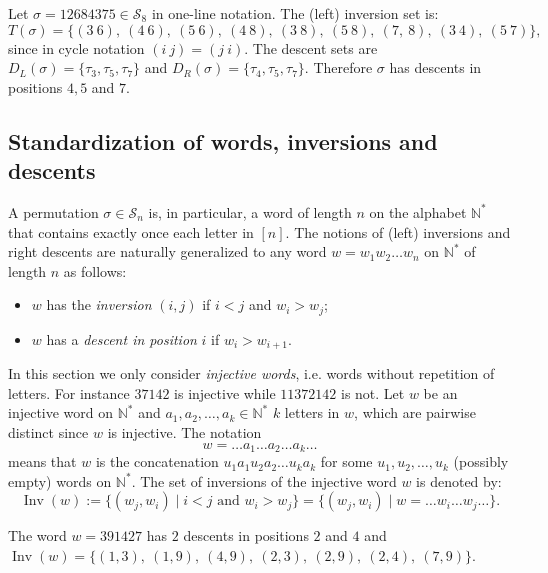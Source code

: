 \documentclass[ALCO,Unicode]{cedram}
\theoremstyle{definition}
\newcommand{\Sym}[1]{\mathcal{S}_{#1}}
\newcommand{\Symn}{\Sym{n}}
\newcommand{\NN}{\mathbb{N}}
\DeclareMathOperator{\invs}{Inv}
\begin{document}
\begin{ex}\label{ex:Sn1} Let $\sigma = 12684375\in\mathcal S_8$ in one-line notation. The (left) inversion set is:
$$
T(\sigma)=\{(3\ 6),\ (4\ 6),\ (5\ 6),\ (4\ 8),\ (3\ 8),\ (5\ 8),\  (7,\ 8),\ (3\ 4),\ (5\ 7)\},
$$ 
since in cycle notation $(i\ j)=(j\ i)$. 
The descent sets are $D_L(\sigma)=\{\tau_3,\tau_5,\tau_7\}$ and $D_R(\sigma)=\{\tau_4, \tau_5,\tau_7\}$. Therefore $\sigma$ has descents in positions $4,5$ and $7$.
\end{ex}

\subsection{Standardization of words, inversions and descents}\label{ss:TypeA-inversions}  A permutation $\sigma\in \Symn$ is, in particular, a word of length $n$ on the alphabet $\NN^*$ that contains exactly once each letter in $[n]$.  The notions of (left) inversions and right descents are naturally generalized to any word $w=w_1w_2\dots w_n$ on $\NN^*$ of length $n$ as follows:
\begin{itemize}
\item  $w$ has the {\em inversion} $(i,j)$ if $i < j$ and $w_i > w_j$;
\item $w$ has a  \emph{descent in position} $i$ if $w_i > w_{i+1}$. 
\end{itemize}

In this section we only consider {\em injective words}, i.e. words without repetition of letters. For instance $37142$ is injective while $11372142$ is not. Let $w$ be an injective word on $\NN^*$ and $a_1, a_2,\dots,a_k \in\NN^*$ $k$ letters in $w$, which are pairwise distinct since $w$ is injective. The notation
$$
w=\dots a_1\dots a_2\dots a_k\dots
$$
means that $w$ is the concatenation $u_1 a_1u_2 a_2\dots u_k a_k$ for some $u_1,u_2,\dots,u_k$ (possibly empty) words on $\NN^*$.  The set of inversions of the injective word $w$ is denoted by:
\begin{equation}\label{eq:Invs}
\invs(w) := \lbrace (w_j, w_i) \mid i < j \text{ and } w_i > w_j \rbrace= \lbrace (w_j, w_i) \mid w=\dots w_i \dots w_j \dots \rbrace.
\end{equation}


\begin{ex}\label{ex:Words1}  The word $w = 391427$ has $2$ descents in positions $2$ and $4$ and $\invs(w)=\{(1,3),\ (1,9), \ (4,9),\  (2,3),\ (2,9),\ (2,4),\ (7,9)\}$.
\end{ex}
\end{document}
